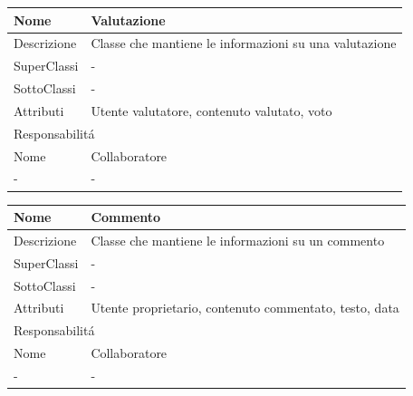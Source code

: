 \begin{center}
    \begin{tabular}{ |p{3cm}|p{3cm}|p{3cm}|p{3cm}| }
        \hline
        Nome & \multicolumn{3}{|p{9cm}|}{Valutazione} \\\hline
        Descrizione & \multicolumn{3}{|p{9cm}|}{Classe che mantiene le informazioni su una valutazione} \\\hline
        SuperClassi & \multicolumn{3}{|p{9cm}|}{-} \\\hline
        SottoClassi & \multicolumn{3}{|p{9cm}|}{-} \\\hline
        Attributi & \multicolumn{3}{|p{9cm}|}{Utente valutatore, contenuto valutato, voto} \\\hline
        \multicolumn{4}{|p{12cm}|}{Responsabilit\'a} \\\hline
        \multicolumn{2}{|p{6cm}|}{Nome} & \multicolumn{2}{|p{6cm}|}{Collaboratore} \\\hline
        \multicolumn{2}{|p{6cm}|}{-} & \multicolumn{2}{|p{6cm}|}{-} \\\hline
    \end{tabular}
\end{center}

\begin{center}
    \begin{tabular}{ |p{3cm}|p{3cm}|p{3cm}|p{3cm}| }
        \hline
        Nome & \multicolumn{3}{|p{9cm}|}{Commento} \\\hline
        Descrizione & \multicolumn{3}{|p{9cm}|}{Classe che mantiene le informazioni su un commento} \\\hline
        SuperClassi & \multicolumn{3}{|p{9cm}|}{-} \\\hline
        SottoClassi & \multicolumn{3}{|p{9cm}|}{-} \\\hline
        Attributi & \multicolumn{3}{|p{9cm}|}{Utente proprietario, contenuto commentato, testo, data} \\\hline
        \multicolumn{4}{|p{12cm}|}{Responsabilit\'a} \\\hline
        \multicolumn{2}{|p{6cm}|}{Nome} & \multicolumn{2}{|p{6cm}|}{Collaboratore} \\\hline
        \multicolumn{2}{|p{6cm}|}{-} & \multicolumn{2}{|p{6cm}|}{-} \\\hline
    \end{tabular}
\end{center}


